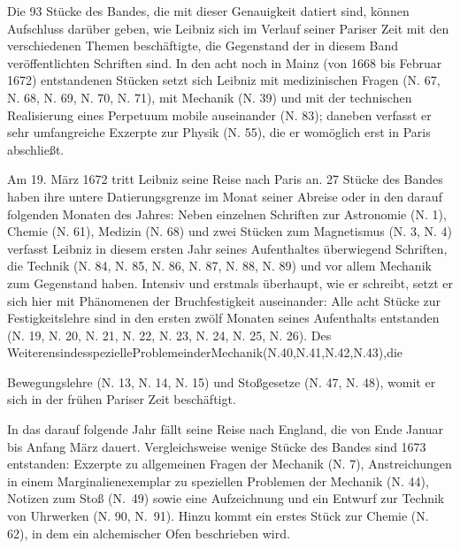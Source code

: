 Die 93 Stücke des Bandes, die mit dieser Genauigkeit datiert sind, können Aufschluss darüber geben, wie Leibniz sich im Verlauf seiner Pariser Zeit mit den verschiedenen Themen beschäftigte, die Gegenstand der in diesem Band veröffentlichten Schriften sind. In den acht noch in Mainz (von 1668 bis Februar 1672) entstandenen Stücken setzt sich Leibniz mit medizinischen Fragen (N. 67, N. 68, N. 69, N. 70, N. 71), mit Mechanik (N. 39) und mit der technischen Realisierung eines Perpetuum mobile auseinander (N. 83); daneben verfasst er sehr umfangreiche Exzerpte zur Physik (N. 55), die er womöglich erst in Paris abschließt.\par
Am 19. März 1672 tritt Leibniz seine Reise nach Paris an. 27 Stücke des Bandes haben ihre untere Datierungsgrenze im Monat seiner Abreise oder in den darauf folgenden Monaten des Jahres: Neben einzelnen Schriften zur Astronomie (N. 1), Chemie (N. 61), Medizin (N. 68) und zwei Stücken zum Magnetismus (N. 3, N. 4) verfasst Leibniz in diesem ersten Jahr seines Aufenthaltes überwiegend Schriften, die Technik (N. 84, N. 85, N. 86, N. 87, N. 88, N. 89) und vor allem Mechanik zum Gegenstand haben. Intensiv und erstmals überhaupt, wie er schreibt, setzt er sich hier mit Phänomenen der Bruchfestigkeit auseinander: Alle acht Stücke zur Festigkeitslehre sind in den ersten zwölf Monaten seines Aufenthalts entstanden (N. 19, N. 20, N. 21, N. 22, N. 23, N. 24, N. 25, N. 26). Des Weiteren\hfill sind\hfill es\hfill spezielle\hfill Probleme\hfill in\hfill der\hfill Mechanik\hfill (N.\hfill 40,\hfill N.\hfill 41,\hfill N.\hfill 42,\hfill N.\hfill 43),\hfill die 
\par\newpage\noindent Bewegungslehre (N. 13, N. 14, N. 15) und Stoßgesetze (N. 47, N. 48), womit er sich in der frühen Pariser Zeit beschäftigt.\par 
In das darauf folgende Jahr fällt seine Reise nach England, die von Ende Januar bis Anfang März dauert. Vergleichsweise wenige Stücke des Bandes sind 1673 entstanden: Exzerpte zu allgemeinen Fragen der Mechanik (N. 7), Anstreichungen in einem Marginalienexemplar zu speziellen Problemen der Mechanik (N. 44), Notizen zum Stoß (N.~49) sowie eine Aufzeichnung und ein Entwurf zur Technik von Uhrwerken (N. 90, N.~91). Hinzu kommt ein erstes Stück zur Chemie (N. 62), in dem ein alchemischer Ofen beschrieben wird.\par
